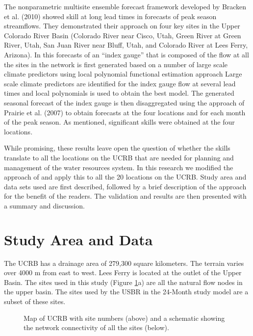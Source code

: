 \documentclass[final,5p,times,twocolumn,authoryear]{elsarticle}
\begin{document}
The nonparametric multisite ensemble forecast framework developed by Bracken et al. (2010) showed skill at long lead times in forecasts of peak season streamflows. They demonstrated their approach on four key sites in the Upper Colorado River Basin (Colorado River near Cisco, Utah, Green River at Green River, Utah, San Juan River near Bluff, Utah, and Colorado River at Lees Ferry, Arizona). In this forecasts of an ``index gauge'' that is composed of the flow at all the sites in the network is first generated based on a number of large scale climate predictors using local polynomial functional estimation approach Large scale climate predictors are identified for the index gauge flow at several lead times and local polynomials is used to obtain the best model. The generated seasonal forecast of the index gauge is then disaggregated using the approach of Prairie et al. (2007) to obtain forecasts at the four locations and for each month of the peak season.  As mentioned, significant skills were obtained at the four locations.

While promising, these results leave open the question of whether the skills translate to all the locations on the UCRB that are needed for planning and management of the water resources system. In this research we modified the approach of \cite{Bracken:2010cw} and apply this to all the 20 locations on the UCRB. Study area and data sets used are first described, followed by a brief description of the approach for the benefit of the readers. The validation and results are then presented with a summary and discussion.


\section{Study Area and Data}
The UCRB has a drainage area of 279,300 square kilometers.  The terrain varies over 4000 m from east to west. Lees Ferry is located at the outlet of the Upper Basin.  The sites used in this study (Figure \ref{fig:map}a) are all the natural flow nodes in the upper basin.  The sites used by the USBR in the 24-Month study model are a subset of these sites.


\begin{figure}[!htbp] %
   \centering
   
   
   \caption{Map of UCRB with site numbers (above) and a schematic showing the network connectivity of all the sites (below).}
   \label{fig:map}
\end{figure}
\end{document}
